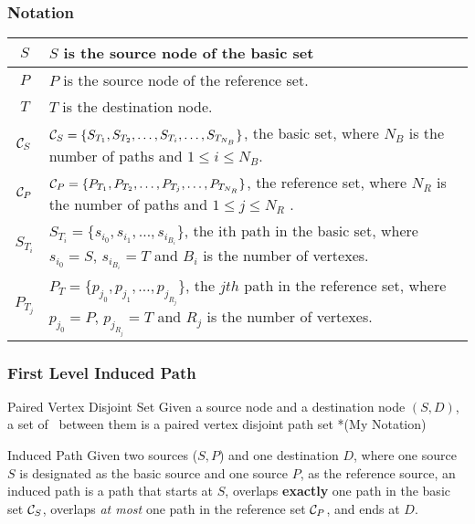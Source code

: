 \documentclass{beamer}
\begin{document}
\begin{frame}
  \frametitle{Notation}
  \begin{tabular}{|c|p{22em}|}
    \hline
    $S$&$S$ is the source node of the basic set\\
    \hline
    $P$&$P$ is the source node of the reference set.\\ 
    \hline
    $T$&$T$ is the destination node.\\
    \hline
    ${\mathcal C}_S$&${\mathcal C}_S = \{S_{T_1} , S_{T_2} ,\dots, S_{T_i} ,\dots, S_{T_{N_B}} \}$, the basic set, where $N_B$ is the number of paths and $1 \le i \le N_B$.\\
    \hline
    ${\mathcal C}_P$& ${\mathcal C}_P = \{P_{T_1} , P_{T_2} ,\dots, P_{T_j} ,\dots, P_{T_{N_R}} \}$, the reference set, where $N_R$ is the number of paths and $1 \le j \le N_R$ .\\
    \hline
    $S_{T_i}$&$S_{T_i} = \{s_{i_0} , s_{i_1} ,\dots, s_{i_{B_i}} \}$, the ith path in the basic set, where $s_{i_0}= S$, $s_{i_{B_i}} = T$ and $B_i$ is the number of vertexes.\\
    \hline
    $P_{T_j}$ & $P_T= \{p_{j_0} , p_{j_1} ,\dots, p_{j_{R_j}}\}$, the $jth$ path in the reference set, where $p_{j_0} = P$, $p_{j_{R_j}}= T$ and $R_j$ is the number of vertexes. \\
    \hline
  \end{tabular}
  
\end{frame}
\begin{frame}
  \frametitle{First Level Induced Path}
  \begin{block}{Paired Vertex Disjoint Set}
    Given a source node and a destination node $(S,D)$, a set of \vdps\ between them is a paired vertex disjoint path set *(My Notation)
  \end{block}
  \begin{block}{Induced Path}
    Given two sources ($S,P$) and one destination $D$, where one source $S$ is designated as the basic source and one source $P$, as the reference source, an induced path is a path that starts at $S$, overlaps {\bf exactly} one path in the basic set ${\mathcal C}_S$, overlaps {\em at most} one path in the reference set ${\mathcal C}_P$, and ends at $D$. 
  \end{block}
\end{frame}
\end{document}
